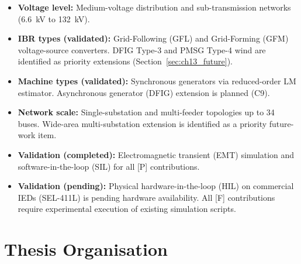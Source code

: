 \begin{itemize}
\item \textbf{Voltage level:} Medium-voltage distribution and sub-transmission
      networks (6.6~kV to 132~kV).
\item \textbf{IBR types (validated):} Grid-Following (GFL) and Grid-Forming (GFM)
      voltage-source converters. DFIG Type-3 and PMSG Type-4 wind are identified
      as priority extensions (Section~\ref{sec:ch13_future}).
\item \textbf{Machine types (validated):} Synchronous generators via reduced-order
      LM estimator. Asynchronous generator (DFIG) extension is planned (C9).
\item \textbf{Network scale:} Single-substation and multi-feeder topologies up
      to 34 buses. Wide-area multi-substation extension is identified as a
      priority future-work item.
\item \textbf{Validation (completed):} Electromagnetic transient (EMT) simulation
      and software-in-the-loop (SIL) for all [P] contributions.
\item \textbf{Validation (pending):} Physical hardware-in-the-loop (HIL) on
      commercial IEDs (SEL-411L) is pending hardware availability. All [F]
      contributions require experimental execution of existing simulation scripts.
\end{itemize}

\section{Thesis Organisation}
\label{sec:ch1_organisation}

